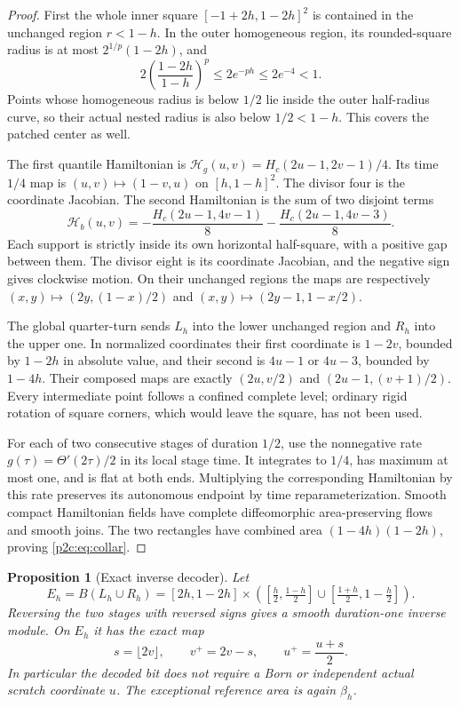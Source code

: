 \documentclass[11pt]{article}
\numberwithin{equation}{section}
\newtheorem{proposition}[theorem]{Proposition}
\theoremstyle{definition}
\theoremstyle{remark}
\begin{document}
\begin{proof}
First the whole inner square $[-1+2h,1-2h]^2$ is contained in
the unchanged region $r<1-h$. In the outer homogeneous region,
its rounded-square radius is at most $2^{1/p}(1-2h)$, and
\[
 2\left(\frac{1-2h}{1-h}\right)^p
 \leq2e^{-ph}\leq2e^{-4}<1.
\]
Points whose homogeneous radius is below $1/2$ lie inside the
outer half-radius curve, so their actual nested radius is also
below $1/2<1-h$. This covers the patched center as well.

The first quantile Hamiltonian is
$\mathcal H_g(u,v)=H_c(2u-1,2v-1)/4$.
Its time $1/4$ map is $(u,v)\mapsto(1-v,u)$ on
$[h,1-h]^2$. The divisor four is the coordinate Jacobian.
The second Hamiltonian is the sum of two disjoint terms
\begin{equation}\label{p2c:eq:halfstreams}
 \mathcal H_b(u,v)=
 -\frac{H_c(2u-1,4v-1)}8
 -\frac{H_c(2u-1,4v-3)}8 .
\end{equation}
Each support is strictly inside its own horizontal half-square,
with a positive gap between them. The divisor eight is its
coordinate Jacobian, and the negative sign gives clockwise
motion. On their unchanged regions the maps are respectively
$(x,y)\mapsto(2y,(1-x)/2)$ and
$(x,y)\mapsto(2y-1,1-x/2)$.

The global quarter-turn sends $L_h$ into the lower unchanged
region and $R_h$ into the upper one. In normalized coordinates
their first coordinate is $1-2v$, bounded by $1-2h$ in absolute
value, and their second is $4u-1$ or $4u-3$, bounded by
$1-4h$. Their composed maps are exactly
$(2u,v/2)$ and $(2u-1,(v+1)/2)$.
Every intermediate point follows a confined complete level;
ordinary rigid rotation of square corners, which would leave
the square, has not been used.

For each of two consecutive stages of duration $1/2$, use the
nonnegative rate
$g(\tau)=\Theta'(2\tau)/2$ in its local stage time.
It integrates to $1/4$, has maximum at most one, and is flat
at both ends. Multiplying the corresponding Hamiltonian by
this rate preserves its autonomous endpoint by time
reparameterization. Smooth compact Hamiltonian fields have
complete diffeomorphic area-preserving flows and smooth
joins. The two rectangles have combined area
$(1-4h)(1-2h)$, proving \eqref{p2c:eq:collar}.
\end{proof}

\begin{proposition}[Exact inverse decoder]\label{p2c:prop:inverse}
Let
\[
 E_h=B(L_h\cup R_h)=
 [2h,1-2h]\times
 \left([\tfrac h2,\tfrac{1-h}2]
       \cup[\tfrac{1+h}2,1-\tfrac h2]\right).
\]
Reversing the two stages with reversed signs gives a smooth
duration-one inverse module. On $E_h$ it has the exact map
\begin{equation}\label{p2c:eq:inverse}
 s=\lfloor2v\rfloor,\qquad
 v^+=2v-s,\qquad u^+=\frac{u+s}{2}.
\end{equation}
In particular the decoded bit does not require a Born or
independent actual scratch coordinate $u$. The exceptional
reference area is again $\beta_h$.
\end{proposition}
\end{document}
